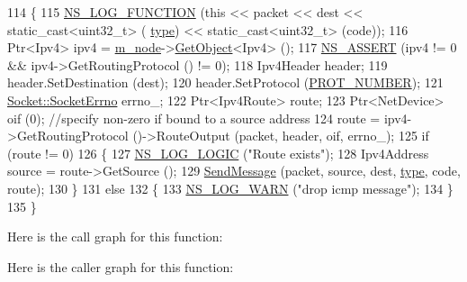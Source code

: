 \begin{DoxyCode}
114 \{
115   \hyperlink{log-macros-disabled_8h_a90b90d5bad1f39cb1b64923ea94c0761}{NS\_LOG\_FUNCTION} (\textcolor{keyword}{this} << packet << dest << static\_cast<uint32\_t> (
      \hyperlink{visualizer-ideas_8txt_add98db9e15e2a58cf2b57623e7aa893a}{type}) << static\_cast<uint32\_t> (code));
116   Ptr<Ipv4> ipv4 = \hyperlink{classns3_1_1Icmpv4L4Protocol_a1130d657dedac6e13bf2ee791ee4f864}{m\_node}->\hyperlink{classns3_1_1Object_a13e18c00017096c8381eb651d5bd0783}{GetObject}<Ipv4> ();
117   \hyperlink{assert_8h_a6dccdb0de9b252f60088ce281c49d052}{NS\_ASSERT} (ipv4 != 0 && ipv4->GetRoutingProtocol () != 0);
118   Ipv4Header header;
119   header.SetDestination (dest);
120   header.SetProtocol (\hyperlink{classns3_1_1Icmpv4L4Protocol_a3419e4f8f36662059a64fcb29c3384ad}{PROT\_NUMBER});
121   \hyperlink{classns3_1_1Socket_ada1328c5ae0c28cb2a982caf8f6d6cca}{Socket::SocketErrno} errno\_;
122   Ptr<Ipv4Route> route;
123   Ptr<NetDevice> oif (0); \textcolor{comment}{//specify non-zero if bound to a source address}
124   route = ipv4->GetRoutingProtocol ()->RouteOutput (packet, header, oif, errno\_);
125   \textcolor{keywordflow}{if} (route != 0)
126     \{
127       \hyperlink{group__logging_ga88acd260151caf2db9c0fc84997f45ce}{NS\_LOG\_LOGIC} (\textcolor{stringliteral}{"Route exists"});
128       Ipv4Address source = route->GetSource ();
129       \hyperlink{classns3_1_1Icmpv4L4Protocol_ae1ebe6f9f90bcb5f3d34efaffe4b37f3}{SendMessage} (packet, source, dest, \hyperlink{visualizer-ideas_8txt_add98db9e15e2a58cf2b57623e7aa893a}{type}, code, route);
130     \}
131   \textcolor{keywordflow}{else}
132     \{
133       \hyperlink{group__logging_gade7208b4009cdf0e25783cd26766f559}{NS\_LOG\_WARN} (\textcolor{stringliteral}{"drop icmp message"});
134     \}
135 \}
\end{DoxyCode}


Here is the call graph for this function\+:




Here is the caller graph for this function\+:


